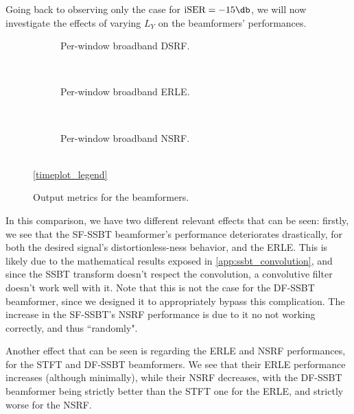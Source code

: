 Going back to observing only the case for $\iser = -15\dB$, we will now investigate the effects of varying $L_Y$ on the beamformers' performances.

\begin{figure}[!t]
	\centering
	\begin{subfigure}{\textwidth}
		\centering
		
		\caption{Per-window broadband DSRF.}
		\label{subfig:lineplot__v7__DSRF__iSER_n15__Ly_var__err_0}
	\end{subfigure}\\[1em]
	\begin{subfigure}{\textwidth}
		\centering
		
		\caption{Per-window broadband ERLE.}
		\label{subfig:lineplot__v7__ERLE__iSER_n15__Ly_var__err_0}
	\end{subfigure}\\[1em]
	\begin{subfigure}{\textwidth}
		\centering
		
		\caption{Per-window broadband NSRF.}
		\label{subfig:lineplot__v7__NSRF__iSER_n15__Ly_var__err_0}
	\end{subfigure}\\[1em]
	\ref*{timeplot_legend}
	\caption{Output metrics for the beamformers.}
	\label{fig:lineplot__v7__iSER_n15__Ly_var__err_0}
\end{figure}

In this comparison, we have two different relevant effects that can be seen: firstly, we see that the SF-SSBT beamformer's performance deteriorates drastically, for both the desired signal's distortionless-ness behavior, and the ERLE. This is likely due to the mathematical results exposed in \cref{app:ssbt_convolution}, and since the SSBT transform doesn't respect the convolution, a convolutive filter doesn't work well with it. Note that this is not the case for the DF-SSBT beamformer, since we designed it to appropriately bypass this complication. The increase in the SF-SSBT's NSRF performance is due to it no not working correctly, and thus ``randomly".

Another effect that can be seen is regarding the ERLE and NSRF performances, for the STFT and DF-SSBT beamformers. We see that their ERLE performance increases (although minimally), while their NSRF decreases, with the DF-SSBT beamformer being strictly better than the STFT one for the ERLE, and strictly worse for the NSRF.

